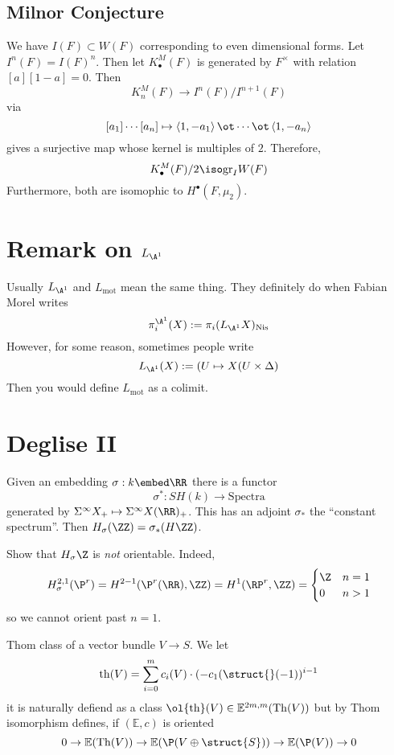 \documentclass{article}
\newcommand{\Th}{\mathrm{Th}}
\begin{document}
\subsection{Milnor Conjecture}

We have $I(F) \subset W(F)$ corresponding to even dimensional forms. Let $I^n(F) = I(F)^n$. Then let $K^M_\bullet(F)$ is generated by $F^\times$ with relation $[a][1-a] = 0$. Then
\[ K^M_n(F) \to I^n(F) / I^{n+1}(F) \]
via
\[ [a_1] \cdots [a_n] \mapsto \left<1,-a_1\right> \ot \cdots \ot \left<1, -a_n \right> \]
gives a surjective map whose kernel is multiples of $2$. Therefore,
\[ K^M_\bullet(F) / 2 \iso \mathrm{gr}_I W(F) \]
Furthermore, both are isomophic to $H^\bullet(F, \mu_2)$. 

\section{Remark on $L_{\A^1}$}

Usually $L_{\A^1}$ and $L_{\text{mot}}$ mean the same thing. They definitely do when Fabian Morel writes
\[ \pi_i^{\A^1}(X) := \pi_i(L_{\A^1} X)_{\text{Nis}} \]
However, for some reason, sometimes people write
\[ L_{\A^1}(X) := (U \mapsto X(U \times \Delta) \]
Then you would define $L_{\text{mot}}$ as a colimit.  

\section{Deglise II}

\renewcommand{\th}{\mathrm{th}}
\newcommand{\EE}{\mathbb{E}}

Given an embedding $\sigma : k \embed \RR$ there is a functor
\[ \sigma^*: SH(k) \to \mathrm{Spectra} \]
generated by $\Sigma^\infty X_{+} \mapsto \Sigma^\infty X(\RR)_+$. This has an adjoint $\sigma_*$ the ``constant spectrum''. Then $H_\sigma(\ZZ) = \sigma_* (H \ZZ)$. 

\begin{rmk}
Show that $H_\sigma \Z$ is \textit{not} orientable. Indeed,
\[ H_\sigma^{2,1}(\P^r) = H^{2-1}(\P^r(\RR), \ZZ) = H^{1}(\RP^r, \ZZ) = 
\begin{cases}
\Z & n = 1
\\
0 & n > 1
\end{cases} \]
so we cannot orient past $n = 1$. 
\end{rmk}

\begin{defn}
Thom class of a vector bundle $V \to S$. We let
\[ \th(V) = \sum_{i = 0}^m c_i(V) \cdot (-c_1(\struct{}(-1))^{i-1} \]
it is naturally defiend as a class $\ol{\th}(V) \in \EE^{2m,m}(\Th(V))$ but by Thom isomorphism defines, if $(\EE, c)$ is oriented
\[ 0 \to \EE(\Th(V)) \to \EE(\P(V \oplus \struct{S})) \to \EE(\P(V)) \to 0 \]
\end{defn}
\end{document}

